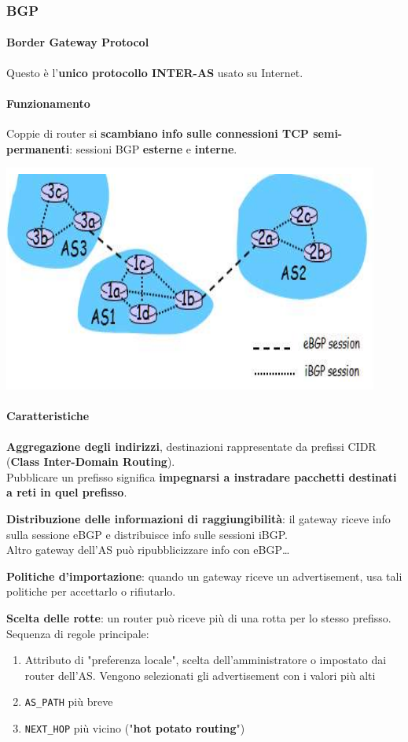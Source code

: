 \documentclass[10pt]{article}
\begin{document}
\subsubsection{BGP}
\paragraph{Border Gateway Protocol} Questo è l'\textbf{unico protocollo INTER-AS} usato su Internet.
\paragraph{Funzionamento} Coppie di router si \textbf{scambiano info sulle connessioni TCP semi-permanenti}: sessioni BGP \textbf{esterne} e \textbf{interne}.
\begin{center}
\includegraphics[scale=1]{bgp.png}
\end{center}
\paragraph{Caratteristiche}
\begin{list}{}{}
	\item \textbf{Aggregazione degli indirizzi}, destinazioni rappresentate da prefissi CIDR (\textbf{Class Inter-Domain Routing}).\\
	Pubblicare un prefisso significa \textbf{impegnarsi a instradare pacchetti destinati a reti in quel prefisso}.
	\item \textbf{Distribuzione delle informazioni di raggiungibilità}: il gateway riceve info sulla sessione eBGP e distribuisce info sulle sessioni iBGP.\\
	Altro gateway dell'AS può ripubblicizzare info con eBGP\ldots
	\item \textbf{Politiche d'importazione}: quando un gateway riceve un advertisement, usa tali politiche per accettarlo o rifiutarlo.
	\item \textbf{Scelta delle rotte}: un router può riceve più di una rotta per lo stesso prefisso. Sequenza di regole principale:
		\begin{enumerate}
			\item Attributo di "preferenza locale", scelta dell'amministratore o impostato dai router dell'AS. Vengono selezionati gli advertisement con i valori più alti
			\item \texttt{AS\_PATH} più breve
			\item \texttt{NEXT\_HOP} più vicino ("\textbf{hot potato routing}")
		\end{enumerate}
\end{list}
\end{document}
